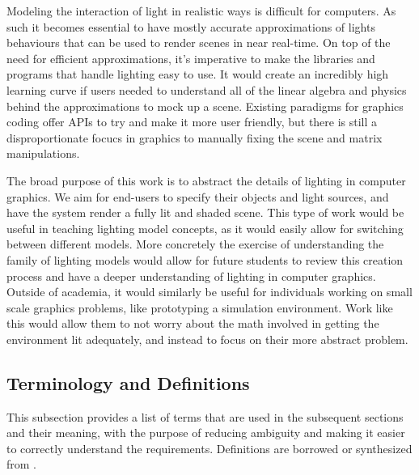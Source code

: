 \documentclass[12pt]{article}
\begin{document}
Modeling the interaction of light in realistic ways is difficult for computers. 
As such it becomes essential to have mostly accurate approximations of lights 
behaviours that can be used to render scenes in near real-time. On top of the 
need for efficient approximations, it's imperative to make the libraries and 
programs that handle lighting easy to use. It would create an incredibly high 
learning curve if users needed to understand all of the linear algebra and 
physics behind the approximations to mock up a scene. Existing paradigms for 
graphics coding offer APIs to try and make it more user friendly, but there is 
still a disproportionate focucs in graphics to manually fixing the scene and 
matrix manipulations. 

The broad purpose of this work is to abstract the details of lighting in 
computer graphics. We aim for end-users to specify their objects and light 
sources, and have the system render a fully lit and shaded scene. This type of 
work would be useful in teaching lighting model concepts, as it would easily 
allow for switching between different models. More concretely the exercise of 
understanding the family of lighting models would allow for future students to 
review this creation process and have a deeper understanding of lighting in 
computer graphics. Outside of academia, it would similarly be useful for 
individuals working on small scale graphics problems, like prototyping a 
simulation environment. Work like this would allow them to not worry about the 
math involved in getting the environment lit adequately, and instead to focus 
on their more abstract problem.

\subsection{Terminology and  Definitions}
This subsection provides a list of terms that are used in the subsequent
sections and their meaning, with the purpose of reducing ambiguity and making it
easier to correctly understand the requirements. Definitions are borrowed or 
synthesized from \cite{Lengyel2003,Comninos2005,shreiner2012}.
\end{document}
